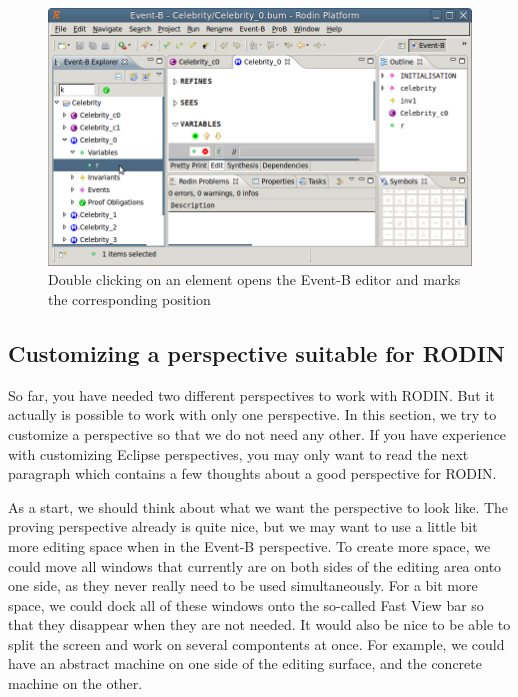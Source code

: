 \begin{figure}[!ht]
\begin{center}
	\includegraphics{img/reference/ref_01_project_explorer1.png}
	\caption{Double clicking on an element opens the Event-B editor and marks the corresponding position}
	\label{fig_ref_01_project_explorer1}
\end{center}
\end{figure}

\subsection{Customizing a perspective suitable for RODIN}
\label{customizing_a_perspective_suitable_for_rodin}

So far, you have needed two different perspectives to work with RODIN. But it actually is possible to work with only one perspective. In this section, we try to customize a perspective so that we do not need any other. If you have experience with customizing Eclipse perspectives, you may only want to read the next paragraph which contains a few thoughts about a good perspective for RODIN.

As a start, we should think about what we want the perspective to look like. The proving perspective already is quite nice, but we may want to use a little bit more editing space when in the Event-B perspective. To create more space, we could move all windows that currently are on both sides of the editing area onto one side, as they never really need to be used simultaneously. For a bit more space, we could dock all of these windows onto the so-called Fast View bar so that they disappear when they are not needed. It would also be nice to be able to split the screen and work on several compontents at once. For example, we could have an abstract machine on one side of the editing surface, and the concrete machine on the other.


